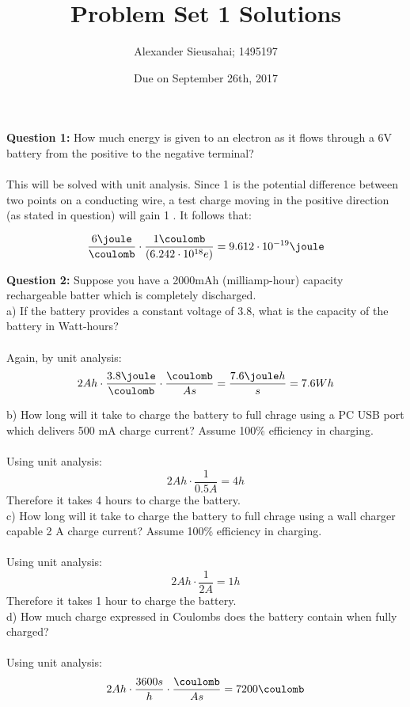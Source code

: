 \documentclass{article}
\title{Problem Set 1 Solutions}
\date{Due on September 26th, 2017}
\author{Alexander Sieusahai; 1495197}
\begin{document}
\maketitle

\textbf{Question 1:} How much energy is given to an electron as it flows through a 6V battery from the positive to the negative terminal? \\
\\
This will be solved with unit analysis. Since 1 \volt is the potential difference between two points on a conducting wire, a test charge moving in the positive direction (as stated in question) will gain 1 \volt. It follows that:

\[ \frac{6\joule}{\coulomb} \cdot \frac{1\coulomb}{(6.242\cdot10^{18}e)} = 9.612\cdot10^{-19}\joule \]



\textbf{Question 2:} Suppose you have a 2000mAh (milliamp-hour) capacity rechargeable batter which is completely discharged. \\

\tab a) If the battery provides a constant voltage of 3.8\volt, what is the capacity of the battery in Watt-hours?\\
\\
Again, by unit analysis: 
\[ 2Ah \cdot \frac{3.8\joule}{\coulomb} \cdot \frac{\coulomb}{As} = \frac{7.6\joule h}{s} = 7.6Wh \]

\tab b) How long will it take to charge the battery to full chrage using a PC USB port which delivers 500 mA charge current? Assume 100\% efficiency in charging. \\
\\
Using unit analysis:
\[2Ah \cdot \frac{1}{0.5A} = 4h \]
Therefore it takes 4 hours to charge the battery.
\\


\tab c) How long will it take to charge the battery to full chrage using a wall charger capable 2 A charge current? Assume 100\% efficiency in charging. \\
\\
Using unit analysis:
\[2Ah \cdot \frac{1}{2A} = 1h \]
Therefore it takes 1 hour to charge the battery.
\\


\tab d) How much charge expressed in Coulombs does the battery contain when fully charged?\\
\\
Using unit analysis:
\[2Ah \cdot \frac{3600s}{h} \cdot \frac{\coulomb}{As} = 7200\coulomb \]
\end{document}
